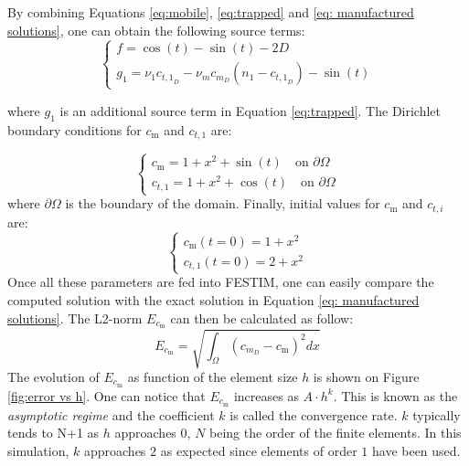 By combining Equations \ref{eq:mobile}, \ref{eq:trapped} and \ref{eq: manufactured solutions}, one can obtain the following source terms:
\begin{equation}
    \begin{cases}
    f = \cos(t) - \sin(t) - 2D \\
    g_1 = \nu_1 c_{{t,1}_D} - \nu_m c_{m_D} ( n_1 - c_{{t,1}_D}) - \sin(t)
    \end{cases}
    \label{eq:sources}
\end{equation}

where $g_1$ is an additional source term in Equation \ref{eq:trapped}.
The Dirichlet boundary conditions for $c_\mathrm{m}$ and $c_{t,1}$ are:

\begin{equation}
    \begin{cases}
    c_\mathrm{m} = 1 + x^2 + \sin(t) \quad \text{on } \partial \Omega \\
    c_{t,1} = 1 + x^2 + \cos(t) \quad \text{on } \partial \Omega 
    \end{cases}
\end{equation}
where $\partial\Omega$ is the boundary of the domain.
Finally, initial values for $c_\mathrm{m}$ and $c_{t,i}$ are:
\begin{equation}
    \begin{cases}
    c_\mathrm{m}(t=0) = 1 + x^2 \\
    c_{t,1}(t=0) = 2 + x^2
    \end{cases}
\end{equation}
Once all these parameters are fed into FESTIM, one can easily compare the computed solution with the exact solution in Equation \ref{eq: manufactured solutions}.
The L2-norm $E_{c_\mathrm{m}}$ can then be calculated as follow:
\begin{equation}
    E_{c_\mathrm{m}} = \sqrt{\int_\Omega(c_{m_D} - c_\mathrm{m})^2dx}
\end{equation}
The evolution of $E_{c_\mathrm{m}}$ as function of the element size $h$ is shown on Figure \ref{fig:error vs h}.
One can notice that $E_{c_\mathrm{m}}$ increases as $A\cdot h^k$.
This is known as the \textit{asymptotic regime} and the coefficient $k$ is called the convergence rate.
$k$ typically tends to N+1 as $h$ approaches $0$, $N$ being the order of the finite elements.
In this simulation, $k$ approaches $2$ as expected since elements of order $1$ have been used.

